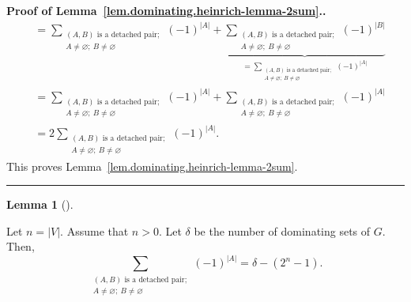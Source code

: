 \documentclass[numbers=enddot,12pt,final,onecolumn,notitlepage]{scrartcl}%
\theoremstyle{definition}
\newtheorem{lem}[theo]{Lemma}
\newenvironment{lemma}[1][]
{\begin{lem}[#1]\begin{leftbar}}
{\end{leftbar}\end{lem}}
\newenvironment{proof}[1][Proof]{\noindent\textbf{#1.} }{\ \rule{0.5em}{0.5em}}
\let\sumnonlimits\sum
\renewcommand{\sum}{\sumnonlimits\limits}
\newcommand{\abs}[1]{\left| #1 \right|}
\newcommand{\tup}[1]{\left( #1 \right)}
\begin{document}
\begin{proof}[Proof of Lemma~\ref{lem.dominating.heinrich-lemma-2sum}.]
\begin{align*}
& =
\sum_{\substack{\tup{A, B} \text{ is a detached pair}; \\
                A \neq \varnothing; \  B \neq \varnothing}}
  \tup{-1}^{\abs{A}}
+
\underbrace{
\sum_{\substack{\tup{A, B} \text{ is a detached pair}; \\
                A \neq \varnothing; \  B \neq \varnothing}}
  \tup{-1}^{\abs{B}}
}_{
=
\sum_{\substack{\tup{A, B} \text{ is a detached pair}; \\
                A \neq \varnothing; \  B \neq \varnothing}}
  \tup{-1}^{\abs{A}}
} \\
& =
\sum_{\substack{\tup{A, B} \text{ is a detached pair}; \\
                A \neq \varnothing; \  B \neq \varnothing}}
  \tup{-1}^{\abs{A}}
+
\sum_{\substack{\tup{A, B} \text{ is a detached pair}; \\
                A \neq \varnothing; \  B \neq \varnothing}}
  \tup{-1}^{\abs{A}} \\
& = 2
\sum_{\substack{\tup{A, B} \text{ is a detached pair}; \\
                A \neq \varnothing; \  B \neq \varnothing}}
  \tup{-1}^{\abs{A}}
.
\end{align*}
This proves
Lemma~\ref{lem.dominating.heinrich-lemma-2sum}.
\end{proof}

\begin{lemma} \label{lem.dominating.heinrich-lemma-2sum2}
Let $n = \abs{V}$. Assume that $n > 0$. Let $\delta$
be the number of dominating sets of $G$. Then,
\[
\sum_{\substack{\tup{A, B} \text{ is a detached pair}; \\
                A \neq \varnothing; \  B \neq \varnothing}}
  \tup{-1}^{\abs{A}}
= \delta - \tup{2^n - 1}.
\]
\end{lemma}
\end{document}
